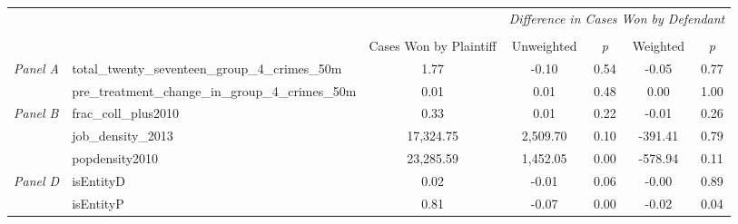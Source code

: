 \begin{tabular}{llccccc}
\toprule
 &  & \textit{} & \multicolumn{4}{c}{\textit{Difference in Cases Won by Defendant}} \\
\cline{4-7}
\\
 &  & Cases Won by Plaintiff & Unweighted & \emph{p} & Weighted & \emph{p} \\
\midrule
\multirow[c]{2}{3cm}{\textit{Panel A}} & total_twenty_seventeen_group_4_crimes_50m & 1.77 & -0.10 & 0.54 & -0.05 & 0.77 \\
 & pre_treatment_change_in_group_4_crimes_50m & 0.01 & 0.01 & 0.48 & 0.00 & 1.00 \\
\cline{1-7}
\multirow[c]{3}{3cm}{\textit{Panel B}} & frac_coll_plus2010 & 0.33 & 0.01 & 0.22 & -0.01 & 0.26 \\
 & job_density_2013 & 17,324.75 & 2,509.70 & 0.10 & -391.41 & 0.79 \\
 & popdensity2010 & 23,285.59 & 1,452.05 & 0.00 & -578.94 & 0.11 \\
\cline{1-7}
\multirow[c]{2}{3cm}{\textit{Panel D}} & isEntityD & 0.02 & -0.01 & 0.06 & -0.00 & 0.89 \\
 & isEntityP & 0.81 & -0.07 & 0.00 & -0.02 & 0.04 \\
\cline{1-7}
\bottomrule
\end{tabular}
